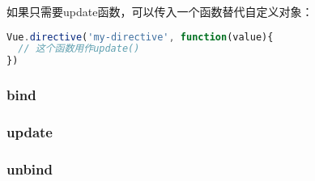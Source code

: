 如果只需要update函数，可以传入一个函数替代自定义对象：


\begin{lstlisting}[language=JavaScript]
Vue.directive('my-directive', function(value){
  // 这个函数用作update()
})
\end{lstlisting}

\subsubsection{bind}





\subsubsection{update}


\subsubsection{unbind}



\begin{lstlisting}[language=JavaScript]

\end{lstlisting}




\begin{lstlisting}[language=JavaScript]

\end{lstlisting}




\begin{lstlisting}[language=JavaScript]

\end{lstlisting}




\begin{lstlisting}[language=JavaScript]

\end{lstlisting}




\begin{lstlisting}[language=JavaScript]

\end{lstlisting}
